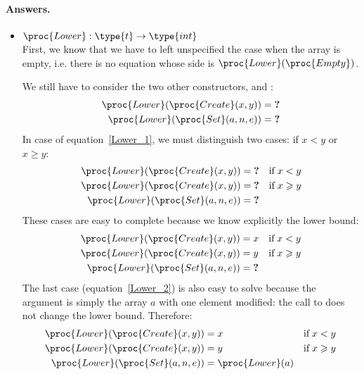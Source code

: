 \paragraph{Answers.}

\begin{itemize}

  \item \(\proc{Lower} : \type{t} \rightarrow \type{int}\)\\
  First, we know that we have to left unspecified the case when the
  array is empty, i.e. there is no equation whose side is
  \(\proc{Lower} (\proc{Empty})\).

  We still have to consider the two other constructors, 
  and :
  \begin{align}
       \proc{Lower} (\proc{Create} (x, y)) 
    &= \textbf{?} \label{Lower_1}\\
       \proc{Lower} (\proc{Set} (a, n, e)) 
    &= \textbf{?} \label{Lower_2}
  \end{align}
  In case of equation~\ref{Lower_1}, we must distinguish two cases: if
  \(x < y\) or \(x \geqslant y\):
  \begin{align*}
       \proc{Lower} (\proc{Create} (x, y)) 
    &= \textbf{?} 
    &  \text{if} \;x < y\\
       \proc{Lower} (\proc{Create} (x, y)) 
    &= \textbf{?} 
    &  \text{if} \;x \geqslant y\\
       \proc{Lower} (\proc{Set} (a, n, e)) 
    &= \textbf{?}
  \end{align*}
  These cases are easy to complete because we know explicitly the
  lower bound:
  \begin{align*}
       \proc{Lower} (\proc{Create} (x, y)) 
    &= x
    &  \text{if} \;x < y\\
       \proc{Lower} (\proc{Create} (x, y)) 
    &= y
    &  \text{if} \;x \geqslant y\\
       \proc{Lower} (\proc{Set} (a, n, e)) 
    &= \textbf{?}
  \end{align*}
  The last case (equation~\ref{Lower_2}) is also easy to solve because
  the argument is simply the array \(a\) with one element modified:
  the call to  does not change the lower bound. Therefore:
  \begin{align*}
       \proc{Lower} (\proc{Create} (x, y)) 
    &= x
    &  \text{if} \;x < y\\
       \proc{Lower} (\proc{Create} (x, y)) 
    &= y
    &  \text{if} \;x \geqslant y\\
       \proc{Lower} (\proc{Set} (a, n, e)) 
    &= \proc{Lower} (a)
  \end{align*}


\end{itemize}
